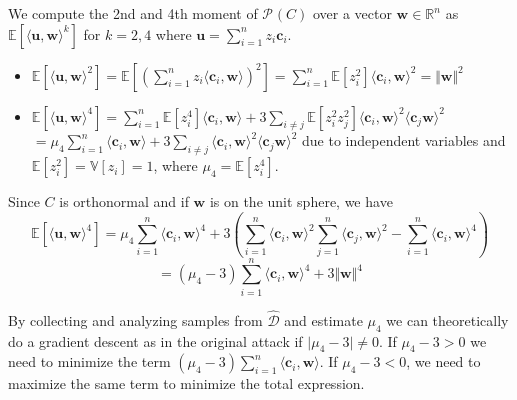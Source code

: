\documentclass[12 pt]{article}        	%
\newcommand{\PP}[2][]{\mathcal{P}_{#1}(\mat{#2})}
\newcommand{\mat}[1]{\mathit{#1}}
\renewcommand{\vec}[1]{\mathbf{#1}}
\newcommand{\bb}[1]{\mathbb{#1}}
\newcommand{\dgdi}{\widehat{\mathcal{D}}}
\renewcommand{\dot}[2]{\langle \vec{#1}, \vec{#2} \rangle}
\begin{document}
We compute the 2nd and 4th moment of $\PP{C}$ over a vector $\vec{w} \in \bb{R}^n$ as $\bb{E}[\langle \vec{u}, \vec{w} \rangle ^k]$ for $k=2,4$ where $\vec{u} = \sum_{i=1}^{n}z_i \vec{c}_i.$ 
\begin{itemize}
    \item $\bb{E}[\langle \vec{u}, \vec{w} \rangle ^2] = \bb{E}[(\sum_{i=1}^{n} z_i \langle \vec{c}_i, \vec{w} \rangle )^2] = \sum_{i=1}^{n}\bb{E}[z_i^2]\langle \vec{c}_i, \vec{w} \rangle^2 = \Vert \vec{w} \Vert ^2$
    \item $\bb{E}[\dot{u}{w} ^4] = \sum_{i=1}^{n}\bb{E}[z_i ^4] \langle \vec{c}_i, \vec{w} \rangle  + 3\sum_{i \neq j} \bb{E}[z_i^2 z_j^2] \langle \vec{c}_i, \vec{w} \rangle ^2 \langle \vec{c}_j \vec{w} \rangle^2$ \\
        $= \mu_4 \sum_{i=1}^{n} \langle \vec{c}_i, \vec{w} \rangle + 3\sum_{i \neq j} \langle \vec{c}_i, \vec{w} \rangle ^2 \langle \vec{c}_j \vec{w} \rangle^2$
        due to independent variables and $\bb{E}[z_i ^2] = \bb{V}[z_i] = 1$, where $\mu_4 = \bb{E}[z_i ^4]$.
\end{itemize}
Since $\mat{C}$ is orthonormal and if $\vec{w}$ is on the unit sphere, we have 
\[\bb{E}[\dot{u}{w} ^4] = \mu_4 \sum_{i=1}^{n} \langle \vec{c}_i, \vec{w} \rangle ^4 + 3(\sum_{i=1}^{n} \langle \vec{c}_i, \vec{w} \rangle^2 \sum_{j=1}^{n} \langle \vec{c}_j, \vec{w} \rangle^2 - \sum_{i=1}^{n} \langle \vec{c}_i, \vec{w} \rangle ^4)\]
\[= (\mu_4 - 3)\sum_{i=1}^{n}\langle \vec{c}_i, \vec{w} \rangle^4 + 3 \Vert \vec{w} \Vert ^4\]

By collecting and analyzing samples from $\dgdi$ and estimate $\mu_4$ we can theoretically do a gradient descent as in the original attack if $\lvert \mu_4 - 3 \rvert \neq 0$.
If $\mu_4 - 3 > 0$ we need to minimize the term $(\mu_4 - 3) \sum_{i=1}^{n} \langle \vec{c}_i, \vec{w} \rangle$. If $\mu_4 - 3 < 0$, we need to maximize the same term to minimize the total expression.
\end{document}
